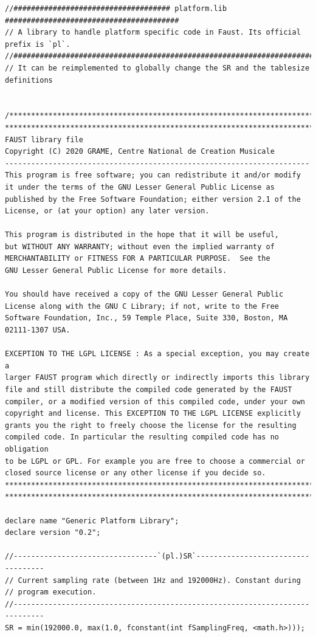 \documentclass{article}
\begin{document}
\bigskip\bigskip
\begin{lstlisting}[caption=\texttt{platform.lib}]
//#################################### platform.lib ########################################
// A library to handle platform specific code in Faust. Its official prefix is `pl`.
//########################################################################################
// It can be reimplemented to globally change the SR and the tablesize definitions


/************************************************************************
************************************************************************
FAUST library file
Copyright (C) 2020 GRAME, Centre National de Creation Musicale
----------------------------------------------------------------------
This program is free software; you can redistribute it and/or modify
it under the terms of the GNU Lesser General Public License as
published by the Free Software Foundation; either version 2.1 of the
License, or (at your option) any later version.

This program is distributed in the hope that it will be useful,
but WITHOUT ANY WARRANTY; without even the implied warranty of
MERCHANTABILITY or FITNESS FOR A PARTICULAR PURPOSE.  See the
GNU Lesser General Public License for more details.

You should have received a copy of the GNU Lesser General Public
License along with the GNU C Library; if not, write to the Free
Software Foundation, Inc., 59 Temple Place, Suite 330, Boston, MA
02111-1307 USA.

EXCEPTION TO THE LGPL LICENSE : As a special exception, you may create a
larger FAUST program which directly or indirectly imports this library
file and still distribute the compiled code generated by the FAUST
compiler, or a modified version of this compiled code, under your own
copyright and license. This EXCEPTION TO THE LGPL LICENSE explicitly
grants you the right to freely choose the license for the resulting
compiled code. In particular the resulting compiled code has no obligation
to be LGPL or GPL. For example you are free to choose a commercial or
closed source license or any other license if you decide so.
************************************************************************
************************************************************************/

declare name "Generic Platform Library";
declare version "0.2";

//---------------------------------`(pl.)SR`-----------------------------------
// Current sampling rate (between 1Hz and 192000Hz). Constant during
// program execution.
//-----------------------------------------------------------------------------
SR = min(192000.0, max(1.0, fconstant(int fSamplingFreq, <math.h>)));


\end{lstlisting}
\end{document}
